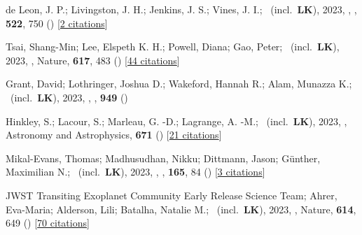 \item[{\color{numcolor}\scriptsize89}] de Leon, J. P.; Livingston, J. H.; Jenkins, J. S.; Vines, J. I.; \etal\ (incl.\ \textbf{LK}), 2023, , \mnras, \textbf{522}, 750 () [\href{https://ui.adsabs.harvard.edu/abs/2023MNRAS.522..750D}{2 citations}]

\item[{\color{numcolor}\scriptsize88}] Tsai, Shang-Min; Lee, Elspeth K. H.; Powell, Diana; Gao, Peter; \etal\ (incl.\ \textbf{LK}), 2023, , Nature, \textbf{617}, 483 () [\href{https://ui.adsabs.harvard.edu/abs/2023Natur.617..483T}{44 citations}]

\item[{\color{numcolor}\scriptsize87}] Grant, David; Lothringer, Joshua D.; Wakeford, Hannah R.; Alam, Munazza K.; \etal\ (incl.\ \textbf{LK}), 2023, , \apj, \textbf{949} ()

\item[{\color{numcolor}\scriptsize86}] Hinkley, S.; Lacour, S.; Marleau, G. -D.; Lagrange, A. -M.; \etal\ (incl.\ \textbf{LK}), 2023, , Astronomy and Astrophysics, \textbf{671} () [\href{https://ui.adsabs.harvard.edu/abs/2023A&A...671L...5H}{21 citations}]

\item[{\color{numcolor}\scriptsize85}] Mikal-Evans, Thomas; Madhusudhan, Nikku; Dittmann, Jason; G{\"u}nther, Maximilian N.; \etal\ (incl.\ \textbf{LK}), 2023, , \aj, \textbf{165}, 84 () [\href{https://ui.adsabs.harvard.edu/abs/2023AJ....165...84M}{3 citations}]

\item[{\color{numcolor}\scriptsize84}] JWST Transiting Exoplanet Community Early Release Science Team; Ahrer, Eva-Maria; Alderson, Lili; Batalha, Natalie M.; \etal\ (incl.\ \textbf{LK}), 2023, , Nature, \textbf{614}, 649 () [\href{https://ui.adsabs.harvard.edu/abs/2023Natur.614..649J}{70 citations}]

